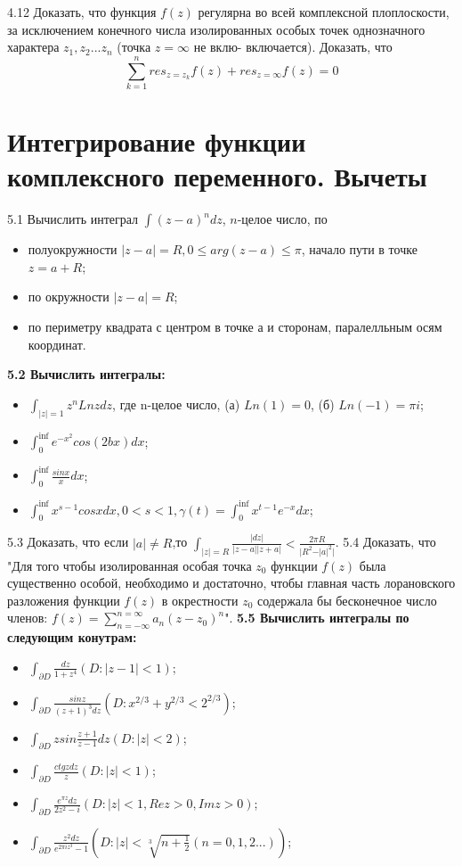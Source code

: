\documentclass{article}
\begin{document}
4.12 Доказать, что функция $f(z)$ регулярна во всей комплексной плоплоскости, за исключением конечного числа изолированных особых точек однозначного характера $z_1, z_2... z_n$ (точка $z = \infty$ не вклю-
включается). Доказать, что $$\sum_{k=1}^n res_{z=z_k}f(z)+res_{z=\infty}f(z)=0$$

\section{Интегрирование функции комплексного переменного. Вычеты}

5.1 Вычислить интеграл $\int (z-a)^ndz$, $n$-целое число, по
\begin{itemize}
\item полуокружности $\vert z - a \vert =R,0\leq arg(z-a)\leq \pi$, начало пути в точке $z=a+R$; 
\item по окружности $\vert z - a \vert =R$;
\item по периметру квадрата с центром в точке а и сторонам, паралелльным осям координат.
\end{itemize} 
\textbf{5.2 Вычислить интегралы:}
\begin{itemize}
\item $\int_{\vert z \vert = 1}z^nLnzdz$, где n-целое число, (а) $Ln(1)=0$, (б) $Ln(-1)=\pi i$;
\item $\int_0^{\inf} e^{-x^2}cos(2bx)dx$;
\item $\int_0^{\inf} \frac{sinx}{x}dx$;
\item $\int_0^{\inf} x^{s-1}cosxdx, 0<s<1, \gamma(t)=\int_0^{\inf} x^{t-1}e^{-x}dx$;
\end{itemize}
5.3 Доказать, что если $\vert a \vert \neq R$,то $\int_{\vert z\vert = R} \frac{\vert dz \vert}{\vert z-a\vert \vert z+a \vert} < \frac{2\pi R}{\vert R^2 - \vert a\vert^2\vert}$.
5.4 Доказать, что "Для того чтобы изолированная особая точка $z_0$ функции $f(z)$ была существенно особой, необходимо и достаточно, чтобы главная часть лорановского разложения функции $f(z)$ в окрестности $z_0$ содержала бы бесконечное число членов: $f(z)=\sum_{n=-\infty}^{n=\infty}a_n(z-z_0)^n$".
\textbf{5.5 Вычислить интегралы по следующим конутрам:}
\begin{itemize}
\item $\int_{\partial D} \frac{dz}{1+z^4} (D: \vert z - 1 \vert < 1)$;
\item $\int_{\partial D} \frac{sin z}{(z+1)^3dz}(D: x^{2/3}+y^{2/3}<2^{2/3})$;
\item $\int_{\partial D} zsin\frac{z+1}{z-1}dz(D:\vert z \vert <2)$;
\item $\int_{\partial D} \frac{ctgzdz}{z}(D:\vert z \vert < 1)$;
\item $\int_{\partial D} \frac{e^{\pi z}dz}{2z^2-i}(D:\vert z \vert < 1, Rez>0, Imz>0)$;
\item $\int_{\partial D} \frac{z^2dz}{e^{2\pi iz^3}-1}(D:\vert z \vert < \sqrt[3]{n+\frac{1}{2}}(n=0,1,2...))$;
\end{itemize}
\end{document}
